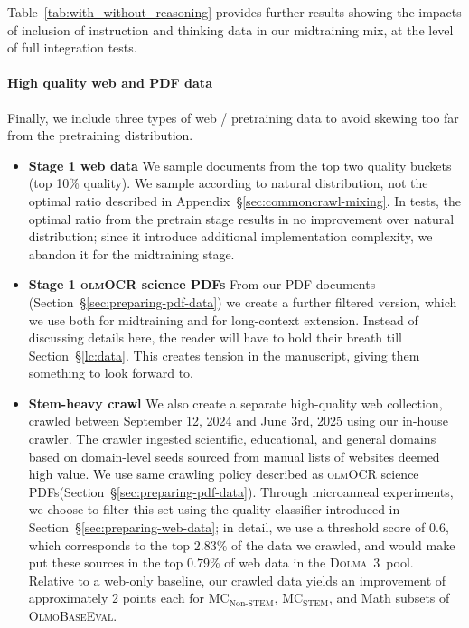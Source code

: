 \documentclass[table]{ai2style/ai2}
\newcommand{\dolmatoo}{\textsc{Dolma~3}\xspace}
\newcommand{\olmocr}{\textsc{olmOCR}\xspace}
\newcommand{\olmothreeeval}{\textsc{OlmoBaseEval}\xspace}
\newcommand{\olmocrPDF}{{\olmocr science PDFs}\xspace}
\begin{document}
Table~\ref{tab:with_without_reasoning} provides further results showing the impacts of inclusion of instruction and thinking data in our midtraining mix, at the level of full integration tests.

\paragraph{High quality web and PDF data}

Finally, we include three types of web / pretraining data to avoid skewing too far from the pretraining distribution.

\begin{itemize}
\item {\bf Stage 1 web data} We sample documents from the top two quality buckets (top 10\% quality).
We sample according to natural distribution, not the optimal ratio described in Appendix~\S\ref{sec:commoncrawl-mixing}.
In tests, the optimal ratio from the pretrain stage results in no improvement over natural distribution; 
since it introduce additional implementation complexity, we abandon it for the midtraining stage.
\item {\bf Stage 1 \olmocrPDF} From our PDF documents (Section~\S\ref{sec:preparing-pdf-data}) we create a further filtered version, which we use both for midtraining and for long-context extension. Instead of discussing details here, the reader will have to hold their breath till Section~\S\ref{lc:data}. This creates tension in the manuscript, giving them something to look forward to. 
\item {\bf Stem-heavy crawl} We also create a separate high-quality web collection, crawled between September 12, 2024 and June 3rd, 2025 using our in-house crawler. 
The crawler ingested scientific, educational, and general domains based on domain-level seeds sourced from manual lists of websites deemed high value. 
We use same crawling policy described as \olmocrPDF (Section~\S\ref{sec:preparing-pdf-data}).
Through microanneal experiments, we choose to filter this set using the quality classifier introduced in Section~\S\ref{sec:preparing-web-data}; 
in detail, we use a threshold score of 0.6, which corresponds to the top $2.83\%$ of the data we crawled, and would make put these sources in the top $0.79\%$ of web data in the \dolmatoo~pool.
Relative to a web-only baseline, our crawled data yields an improvement of  approximately 2 points each for $\text{MC}_\text{Non-STEM}$, $\text{MC}_\text{STEM}$, and Math subsets of \olmothreeeval.
\end{itemize}
\end{document}
